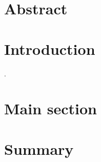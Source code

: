 \documentclass[a4paper, 12pt]{scrartcl}
\begin{document}
\begin{titlepage}
	\begin{center}
		
	\end{center}
\end{titlepage}

\tableofcontents

\newpage

\section{Abstract}
\vspace{4ex}

\newpage


\section{Introduction}

\newpage.
\section{Main section}


\section{Summary}

{}

\end{document}
